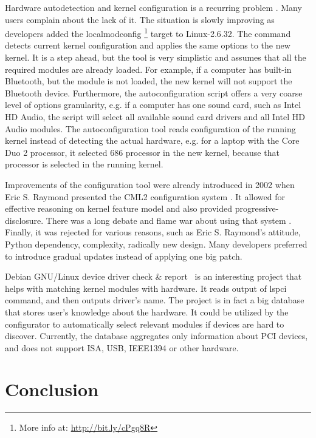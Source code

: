 \documentclass{chi2009}
\begin{document}
Hardware autodetection and kernel configuration is a recurring problem \cite{debian:config:2010,soft32:config:2007}. Many users complain about the lack of it. The situation is slowly improving as developers added the \textsf{localmodconfig} \footnote{More info at: \url{http://bit.ly/cPgq8R}} target to Linux-2.6.32. The command detects current kernel configuration and applies the same options to the new kernel. It is a step ahead, but the tool is very simplistic and assumes that all the required modules are already loaded. For example, if a computer has built-in Bluetooth, but the module is not loaded, the new kernel will not support the Bluetooth device. Furthermore, the autoconfiguration script offers a very coarse level of options granularity, e.g. if a computer has one sound card, such as Intel HD Audio, the script will select all available sound card drivers and all Intel HD Audio modules. The autoconfiguration tool reads configuration of the running kernel instead of detecting the actual hardware, e.g. for a laptop with the Core Duo 2 processor, it selected 686 processor in the new kernel, because that processor is selected in the running kernel.

Improvements of the configuration tool were already introduced in 2002 when Eric S. Raymond presented the CML2 configuration system \cite{raymond:cml2:2000}. It allowed for effective reasoning on kernel feature model and also provided progressive-disclosure. There was a long debate and flame war about using that system \cite{kerneltrap:linux:2002}. Finally, it was rejected for various reasons, such as Eric S. Raymond's attitude, Python dependency, complexity, radically new design. Many developers preferred to introduce gradual updates instead of applying one big patch.

Debian GNU/Linux device driver check \& report~\cite{muto:check:2010} is an interesting project that helps with matching kernel modules with hardware. It reads output of \textsf{lspci} command, and then outputs driver's name. The project is in fact a big database that stores user's knowledge about the hardware. It could be utilized by the configurator to automatically select relevant modules if devices are hard to discover. Currently, the database aggregates only information about PCI devices, and does not support ISA, USB, IEEE1394 or other hardware.

\section{Conclusion}\label{sec:conclusion}



\end{document}
